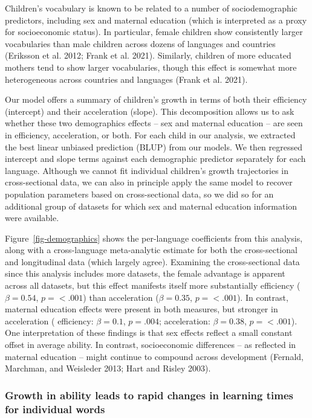 \documentclass[
  11pt,
]{article}
\begin{document}
Children's vocabulary is known to be related to a number of
sociodemographic predictors, including sex and maternal education (which
is interpreted as a proxy for socioeconomic status). In particular,
female children show consistently larger vocabularies than male children
across dozens of languages and countries (Eriksson et al. 2012; Frank et
al. 2021). Similarly, children of more educated mothers tend to show
larger vocabularies, though this effect is somewhat more heterogeneous
across countries and languages (Frank et al. 2021).

Our model offers a summary of children's growth in terms of both their
efficiency (intercept) and their acceleration (slope). This
decomposition allows us to ask whether these two demographics effects --
sex and maternal education -- are seen in efficiency, acceleration, or
both. For each child in our analysis, we extracted the best linear
unbiased prediction (BLUP) from our models. We then regressed intercept
and slope terms against each demographic predictor separately for each
language. Although we cannot fit individual children's growth
trajectories in cross-sectional data, we can also in principle apply the
same model to recover population parameters based on cross-sectional
data, so we did so for an additional group of datasets for which sex and
maternal education information were available.

Figure~\ref{fig-demographics} shows the per-language coefficients from
this analysis, along with a cross-language meta-analytic estimate for
both the cross-sectional and longitudinal data (which largely agree).
Examining the cross-sectional data since this analysis includes more
datasets, the female advantage is apparent across all datasets, but this
effect manifests itself more substantially efficiency (\(\beta = 0.54\),
\(p = < .001\)) than acceleration (\(\beta = 0.35\), \(p = < .001\)). In
contrast, maternal education effects were present in both measures, but
stronger in acceleration ( efficiency: \(\beta = 0.1\), \(p = .004\);
acceleration: \(\beta = 0.38\), \(p = < .001\)). One interpretation of
these findings is that sex effects reflect a small constant offset in
average ability. In contrast, socioeconomic differences -- as reflected
in maternal education -- might continue to compound across development
(Fernald, Marchman, and Weisleder 2013; Hart and Risley 2003).

\subsubsection{Growth in ability leads to rapid changes in learning
times for individual
words}\label{growth-in-ability-leads-to-rapid-changes-in-learning-times-for-individual-words}
\end{document}
